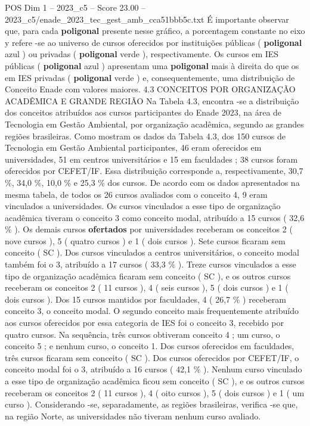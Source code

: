 \begin{textsample}{POS Dim 1 – 2023\_c5 – Score 23.00 – 2023\_c5/enade\_2023\_tec\_gest\_amb\_cca51bbb5c.txt}
É importante observar que, para cada \textbf{poligonal} presente nesse gráfico, a porcentagem constante no eixo y refere -se ao universo de cursos oferecidos por instituições públicas ( \textbf{poligonal} azul ) ou privadas ( \textbf{poligonal} verde ), respectivamente.
Os cursos em IES públicas ( \textbf{poligonal} azul ) apresentam uma \textbf{poligonal} mais à direita do que os em IES privadas ( \textbf{poligonal} verde ) e, consequentemente, uma distribuição de Conceito Enade com valores maiores. 4.3 CONCEITOS POR ORGANIZAÇÃO ACADÊMICA E GRANDE REGIÃO Na Tabela 4.3, encontra -se a distribuição dos conceitos atribuídos aos cursos participantes do Enade 2023, na área de Tecnologia em Gestão Ambiental, por organização acadêmica, segundo as grandes regiões brasileiras.
Como mostram os dados da Tabela 4.3, dos 150 cursos de Tecnologia em Gestão Ambiental participantes, 46 eram oferecidos em universidades, 51 em centros universitários e 15 em faculdades ; 38 cursos foram oferecidos por CEFET/IF.
Essa distribuição corresponde a, respectivamente, 30,7 \%, 34,0 \%, 10,0 \% e 25,3 \% dos cursos.
De acordo com os dados apresentados na mesma tabela, de todos os 26 cursos avaliados com o conceito 4, 9 eram vinculados a universidades.
Os cursos vinculados a esse tipo de organização acadêmica tiveram o conceito 3 como conceito modal, atribuído a 15 cursos ( 32,6 \% ).
Os demais cursos \textbf{ofertados} por universidades receberam os conceitos 2 ( nove cursos ), 5 ( quatro cursos ) e 1 ( dois cursos ).
Sete cursos ficaram sem conceito ( SC ).
Dos cursos vinculados a centros universitários, o conceito modal também foi o 3, atribuído a 17 cursos ( 33,3 \% ).
Treze cursos vinculados a esse tipo de organização acadêmica ficaram sem conceito ( SC ), e os outros cursos receberam os conceitos 2 ( 11 cursos ), 4 ( seis cursos ), 5 ( dois cursos ) e 1 ( dois cursos ).
Dos 15 cursos mantidos por faculdades, 4 ( 26,7 \% ) receberam conceito 3, o conceito modal.
O segundo conceito mais frequentemente atribuído aos cursos oferecidos por essa categoria de IES foi o conceito 3, recebido por quatro cursos.
Na sequência, três cursos obtiveram conceito 4 ; um curso, o conceito 5 ; e nenhum curso, o conceito 1.
Dos cursos oferecidos em faculdades, três cursos ficaram sem conceito ( SC ).
Dos cursos oferecidos por CEFET/IF, o conceito modal foi o 3, atribuído a 16 cursos ( 42,1 \% ).
Nenhum curso vinculado a esse tipo de organização acadêmica ficou sem conceito ( SC ), e os outros cursos receberam os conceitos 2 ( 11 cursos ), 4 ( oito cursos ), 5 ( dois cursos ) e 1 ( um curso ).
Considerando -se, separadamente, as regiões brasileiras, verifica -se que, na região Norte, as universidades não tiveram nenhum curso avaliado.

\end{textsample}
